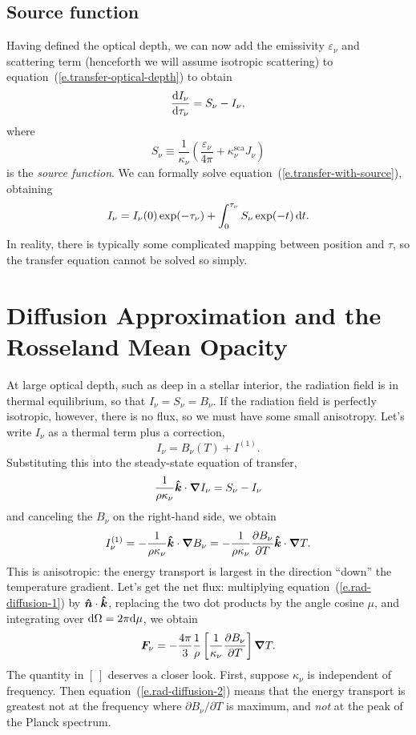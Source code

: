\subsection{Source function}

Having defined the optical depth, we can now add the emissivity $\varepsilon_{\nu}$ and scattering term (henceforth we will assume isotropic scattering) to equation~(\ref{e.transfer-optical-depth}) to obtain
\begin{equation}\label{e.transfer-with-source}
\frac{\mathrm{d} I_{\nu}}{\mathrm{d} \tau_{\nu}} = S_{\nu}-I_{\nu},
\end{equation}
where 
\begin{equation}\label{e.source-fcn-def}
S_{\nu} \equiv \frac{1}{\kappa_{\nu}}\left(\frac{\varepsilon_{\nu}}{4\pi} + \kappa_{\nu}^{\mathrm{sca}}J_{\nu}\right)
\end{equation}
is the \emph{source function}. 
We can formally solve equation~(\ref{e.transfer-with-source}), obtaining
\[ I_{\nu} = I_{\nu}(0)\exp(-\tau_{\nu}) + \int_{0}^{\tau_{\nu}} S_{\nu} \exp(-t)\,\mathrm{d} t. \]
In reality, there is typically some complicated mapping between position and $\tau$, so the transfer equation cannot be solved so simply.

\section[Diffusion Approximation]{Diffusion Approximation and the Rosseland Mean Opacity}

At large optical depth, such as deep in a stellar interior, the radiation field is in thermal equilibrium, so that $I_{\nu} = S_{\nu} = B_{\nu}$.  If the radiation field is perfectly isotropic, however, there is no flux, so we must have some small anisotropy.  Let's write $I_{\nu}$ as a thermal term plus a correction, 
\[ I_{\nu} = B_{\nu}(T) + I^{(1)}. \]
Substituting this into the steady-state equation of transfer,
\[ \frac{1}{\rho\kappa_{\nu}}\boldsymbol{\hat{k}}\cdot\boldsymbol{\nabla} I_{\nu}  = S_{\nu} - I_{\nu}\]
and canceling the $B_{\nu}$ on the right-hand side, we obtain
\begin{equation}\label{e.rad-diffusion-1}
I_{\nu}^{(1)} = -\frac{1}{\rho\kappa_{\nu}} \boldsymbol{\hat{k}}\cdot\boldsymbol{\nabla} B_{\nu} = -\frac{1}{\rho\kappa_{\nu}} \frac{\partial B_{\nu}}{\partial T} \boldsymbol{\hat{k}}\cdot\boldsymbol{\nabla} T.
\end{equation}
This is anisotropic: the energy transport is largest in the direction ``down'' the temperature gradient. Let's get the net flux: multiplying equation~(\ref{e.rad-diffusion-1}) by $\boldsymbol{\hat{n}}\cdot\boldsymbol{\hat{k}}$, replacing the two dot products by the angle cosine $\mu$, and integrating over $\mathrm{d} \Omega = 2\pi \mathrm{d}\mu$, we obtain
\begin{equation}\label{e.rad-diffusion-2}
\boldsymbol{F}_{\nu} = -\frac{4\pi}{3}\frac{1}{\rho}\left[\frac{1}{\kappa_{\nu}}\frac{\partial B_{\nu}}{\partial T}\right]\boldsymbol{\nabla} T.
\end{equation}
The quantity in $[\,]$ deserves a closer look. First, suppose $\kappa_{\nu}$ is independent of frequency. Then equation~(\ref{e.rad-diffusion-2}) means that the energy transport is greatest not at the frequency where $\partial B_{\nu}/\partial T$ is maximum, and \emph{not} at the peak of the Planck spectrum. 

